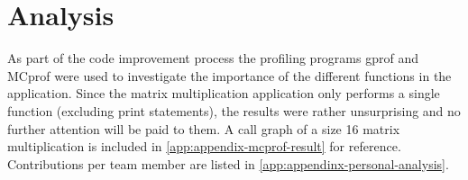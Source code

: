 \documentclass[final]{article}
\begin{document}
\section{Analysis}
As part of the code improvement process the profiling programs gprof and MCprof were used to investigate the importance of the different functions in the application.
Since the matrix multiplication application only performs a single function (excluding print statements), the results were rather unsurprising and no further attention will be paid to them.
A call graph of a size 16 matrix multiplication is included in \cref{app:appendix-mcprof-result} for reference.
Contributions per team member are listed in \cref{app:appendinx-personal-analysis}.
\end{document}
